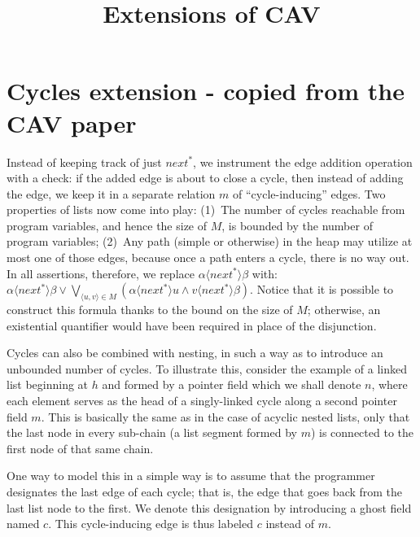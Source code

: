 \documentclass[11pt,a4paper,oneside,draft]{article}
\title{Extensions of CAV}
\theoremstyle{definition}
\theoremstyle{remark}
\begin{document}
\maketitle


\section{Cycles extension - copied from the CAV paper}

\newcommand{\nextf}{\textit{next}}
\newcommand{\B}[1]{\langle{#1}\rangle}
\newcommand{\Lor}{\bigvee}
\newcommand{\AF}{\mbox{$\textit{AF}^R$}}
\newcommand{\tabref}[1]{Table~\ref{Ta:#1}}
\newcommand{\figref}[1]{Fig.~\ref{Fi:#1}}

Instead of keeping track of just $\nextf^*$, we instrument the edge
addition operation with a check: if the added edge is about to close
a cycle, then instead of adding the edge, we keep it in a separate relation $m$ of
``cycle-inducing'' edges. Two properties of lists now come into play:
(1)~The number of cycles reachable from program variables, and hence the size of $M$, is bounded by the number of program variables;
(2)~Any path (simple or otherwise) in the heap may utilize at most one
    of those edges, because once a path enters a cycle, there is no way out.
In all assertions, therefore, we replace $\alpha\B{\nextf^*}\beta$ with:
%
$\alpha\B{\nextf^*}\beta \lor
   \Lor_{\langle u,v\rangle\in M}
      (\alpha\B{\nextf^*}u \land v\B{\nextf^*}\beta)$.
Notice that it is possible to construct this formula thanks to the bound on
the size of $M$; otherwise, an existential quantifier would have been required
in place of the disjunction.

\medskip
Cycles can also be combined with nesting, in such a way as to introduce
an unbounded number of cycles. To illustrate this, consider the example
of a linked list beginning at $h$ and formed by a pointer field which we
shall denote $n$, where each element serves as the head of a singly-linked
cycle along a second pointer field $m$. This is basically the same as
in the case of acyclic nested lists, only that the last node in every
sub-chain (a list segment formed by $m$) is connected to the first node
of that same chain.

One way to model this in a simple way is to assume that the programmer
designates the last edge of each cycle; that is, the edge that goes back
from the last list node to the first.
We denote this designation by introducing a ghost field named $c$. This
cycle-inducing edge is thus labeled $c$ instead of $m$.
\end{document}

